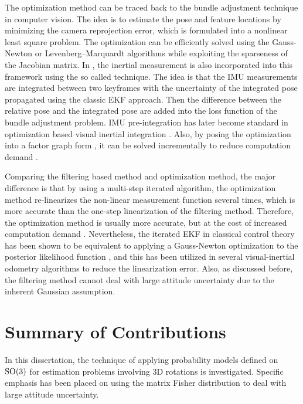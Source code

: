 The optimization method can be traced back to the bundle adjustment technique \cite{triggs1999bundle} in computer vision.
The idea is to estimate the pose and feature locations by minimizing the camera reprojection error, which is formulated into a nonlinear least square problem.
The optimization can be efficiently solved using the Gauss-Newton or Levenberg–Marquardt algorithms while exploiting the sparseness of the Jacobian matrix.
In \cite{forster2016manifold,lupton2011visual}, the inertial measurement is also incorporated into this framework using the so called  technique.
The idea is that the IMU measurements are integrated between two keyframes with the uncertainty of the integrated pose propagated using the classic EKF approach.
Then the difference between the relative pose and the integrated pose are added into the loss function of the bundle adjustment problem.
IMU pre-integration has later become standard in optimization based visual inertial integration \cite{brossard2021associating,mur2017visual,qin2018vins}.
Also, by posing the optimization into a factor graph form \cite{indelman2013information}, it can be solved incrementally to reduce computation demand \cite{kaess2012isam2}.

Comparing the filtering based method and optimization method, the major difference is that by using a multi-step iterated algorithm, the optimization method re-linearizes the non-linear measurement function several times, which is more accurate than the one-step linearization of the filtering method.
Therefore, the optimization method is usually more accurate, but at the cost of increased computation demand \cite{huang2019visual}.
Nevertheless, the iterated EKF in classical control theory has been shown to be equivalent to applying a Gauss-Newton optimization to the posterior likelihood function \cite{bell1993iterated}, and this has been utilized in several visual-inertial odometry algorithms \cite{bloesch2017iterated,bloesch2015robust} to reduce the linearization error.
Also, as discussed before, the filtering method cannot deal with large attitude uncertainty due to the inherent Gaussian assumption.

\section{Summary of Contributions}

In this dissertation, the technique of applying probability models defined on $\mathrm{SO}(3)$ for estimation problems involving 3D rotations is investigated.
Specific emphasis has been placed on using the matrix Fisher distribution to deal with large attitude uncertainty.

